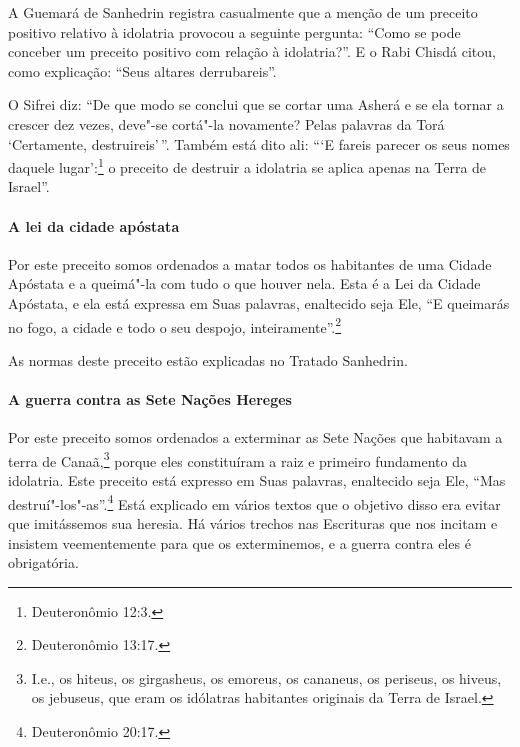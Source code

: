 \begin{multicols}{2}
A Guemará\starr{} de Sanhedrin\starr{} registra casualmente que a menção de um preceito
positivo relativo à idolatria provocou a seguinte pergunta: ``Como se
pode conceber um preceito positivo com relação à idolatria?''. E o Rabi
Chisdá\starr{} citou, como explicação: ``Seus altares derrubareis''.

O Sifrei\starr{} diz: ``De que modo se conclui que se cortar uma
Asherá\starr{} e se ela tornar a crescer dez vezes, deve"-se cortá"-la novamente? Pelas
palavras da Torá\starr{} `Certamente, destruireis'\,''. Também está dito ali:
```E fareis parecer os seus nomes daquele lugar':\footnote{Deuteronômio 12:3.} o
preceito de destruir a idolatria se aplica apenas na Terra de Israel''.

\paragraph{A lei da cidade apóstata}

Por este preceito somos ordenados a matar todos os habitantes de uma
Cidade Apóstata e a queimá"-la com tudo o que houver nela. Esta é a Lei
da Cidade Apóstata, e ela está expressa em Suas palavras, enaltecido
seja Ele, ``E queimarás no fogo, a cidade e todo o seu despojo,
inteiramente''.\footnote{Deuteronômio 13:17.}

As normas deste preceito estão explicadas no Tratado Sanhedrin\starr.

\paragraph{A guerra contra as Sete Nações Hereges}

Por este preceito somos ordenados a exterminar as Sete Nações que
habitavam a terra de Canaã,\footnote{I.e., os hiteus, os girgasheus, os emoreus, os cananeus, os periseus,
  os hiveus, os jebuseus, que eram os idólatras habitantes originais da
  Terra de Israel.} porque eles
constituíram a raiz e primeiro fundamento da idolatria. Este preceito
está expresso em Suas palavras, enaltecido seja Ele, ``Mas
destruí"-los"-as''.\footnote{Deuteronômio 20:17.} Está explicado em vários textos
que o objetivo disso era evitar que imitássemos sua heresia. Há vários
trechos nas Escrituras que nos incitam e insistem veementemente para que
os exterminemos, e a guerra contra eles é obrigatória.


\end{multicols}
